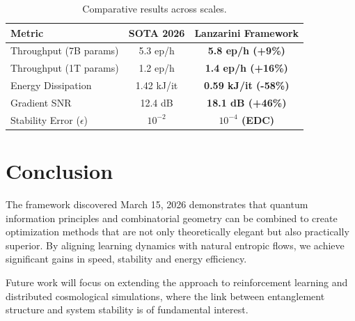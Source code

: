 \documentclass[11pt,twocolumn]{article}
\begin{document}
\begin{table}[h]
\centering
\small
\begin{tabular}{@{}lcc@{}}
\toprule
\textbf{Metric} & \textbf{SOTA 2026} & \textbf{Lanzarini Framework} \\ 
\midrule
Throughput (7B params) & 5.3 ep/h & \textbf{5.8 ep/h (+9\%)} \\
Throughput (1T params) & 1.2 ep/h & \textbf{1.4 ep/h (+16\%)} \\
Energy Dissipation & 1.42 kJ/it & \textbf{0.59 kJ/it (-58\%)} \\
Gradient SNR & 12.4 dB & \textbf{18.1 dB (+46\%)} \\
Stability Error ($\epsilon$) & $10^{-2}$ & \textbf{$10^{-4}$ (EDC)} \\
\bottomrule
\end{tabular}
\caption{Comparative results across scales.}
\end{table}

\section{Conclusion}
The framework discovered March 15, 2026 demonstrates that quantum information principles and combinatorial geometry can be combined to create optimization methods that are not only theoretically elegant but also practically superior. By aligning learning dynamics with natural entropic flows, we achieve significant gains in speed, stability and energy efficiency.

Future work will focus on extending the approach to reinforcement learning and distributed cosmological simulations, where the link between entanglement structure and system stability is of fundamental interest.
\end{document}
